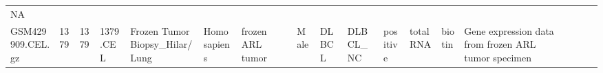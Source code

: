 \documentclass[]{article}
\begin{document}
\begin{longtable}[]{@{}lllllllrllllllllll@{}}
\begin{minipage}[t]{0.01\columnwidth}
NA\strut
\end{minipage}\tabularnewline
\begin{minipage}[t]{0.03\columnwidth}\raggedright
GSM429909.CEL.gz\strut
\end{minipage} & \begin{minipage}[t]{0.02\columnwidth}\raggedright
1379\strut
\end{minipage} & \begin{minipage}[t]{0.01\columnwidth}\raggedright
1379\strut
\end{minipage} & \begin{minipage}[t]{0.02\columnwidth}\raggedright
1379.CEL\strut
\end{minipage} & \begin{minipage}[t]{0.06\columnwidth}\raggedright
Frozen Tumor Biopsy\_Hilar/Lung\strut
\end{minipage} & \begin{minipage}[t]{0.02\columnwidth}\raggedright
Homo sapiens\strut
\end{minipage} & \begin{minipage}[t]{0.04\columnwidth}\raggedright
frozen ARL tumor\strut
\end{minipage} & \begin{minipage}[t]{0.05\columnwidth}\raggedleft
57\strut
\end{minipage} & \begin{minipage}[t]{0.04\columnwidth}\raggedright
Male\strut
\end{minipage} & \begin{minipage}[t]{0.06\columnwidth}\raggedright
DLBCL\strut
\end{minipage} & \begin{minipage}[t]{0.06\columnwidth}\raggedright
DLBCL\_NC\strut
\end{minipage} & \begin{minipage}[t]{0.04\columnwidth}\raggedright
positive\strut
\end{minipage} & \begin{minipage}[t]{0.02\columnwidth}\raggedright
total RNA\strut
\end{minipage} & \begin{minipage}[t]{0.01\columnwidth}\raggedright
biotin\strut
\end{minipage} & \begin{minipage}[t]{0.08\columnwidth}\raggedright
Gene expression data from frozen ARL tumor specimen\strut
\end{minipage} & \begin{minipage}[t]{0.01\columnwidth}\raggedright

\end{minipage}
\end{longtable}
\end{document}
